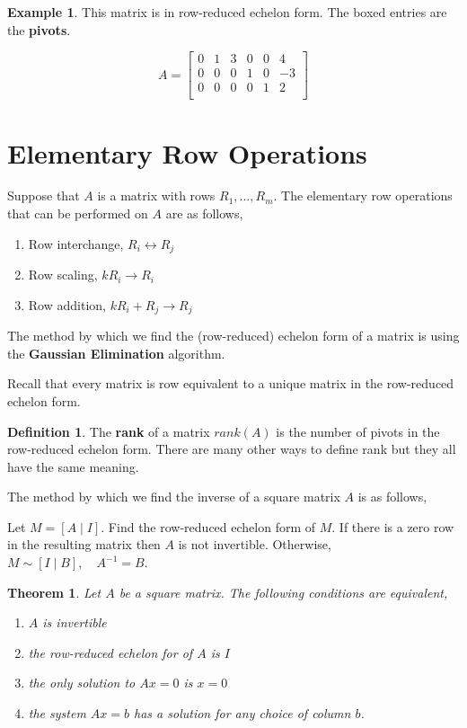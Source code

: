 \documentclass{report}
\newtheorem{_thm}{Theorem}
\theoremstyle{definition}
\newtheorem{_def}{Definition}
\newtheorem{ex}{Example}
\begin{document}
\begin{ex}
This matrix is in row-reduced echelon form.
The boxed entries are the \textbf{pivots}.

\[A=
\begin{bmatrix}
 0 & \boxed{1} & 3 & 0 & 0 & 4 \\
 0 & 0 & 0 & \boxed{1} & 0 & -3 \\
 0 & 0 & 0 & 0 & \boxed{1} & 2 \\
\end{bmatrix}
\]
\end{ex}

\section{Elementary Row Operations}

Suppose that $A$ is a matrix with rows $R_1,...,R_m$.
The elementary row operations that can be performed on $A$ are as follows,

\begin{enumerate}
 \item Row interchange, $R_i\leftrightarrow R_j$
 \item Row scaling, $kR_i\rightarrow R_i$
 \item Row addition, $kR_i+R_j\rightarrow R_j$
\end{enumerate}

The method by which we find the (row-reduced) echelon form of a matrix is using the \textbf{Gaussian Elimination} algorithm. \newline

Recall that every matrix is row equivalent to a unique matrix in the row-reduced echelon form.

\begin{_def}
The \textbf{rank} of a matrix $rank(A)$ is the number of pivots in the row-reduced echelon form.
There are many other ways to define rank but they all have the same meaning.
\end{_def}

The method by which we find the inverse of a square matrix $A$ is as follows,

Let $M=[A\mid I]$. 
Find the row-reduced echelon form of $M$.
If there is a zero row in the resulting matrix then $A$ is not invertible.
Otherwise, $M\sim [I\mid B], \quad A^{-1}=B$.

\begin{_thm}
Let $A$ be a square matrix.
The following conditions are equivalent,
\begin{enumerate}
 \item $A$ is invertible
 \item the row-reduced echelon for of $A$ is $I$
 \item the only solution to $Ax=0$ is $x=0$
 \item the system $Ax=b$ has a solution for any choice of column $b$.
\end{enumerate}
\end{_thm}
\end{document}
